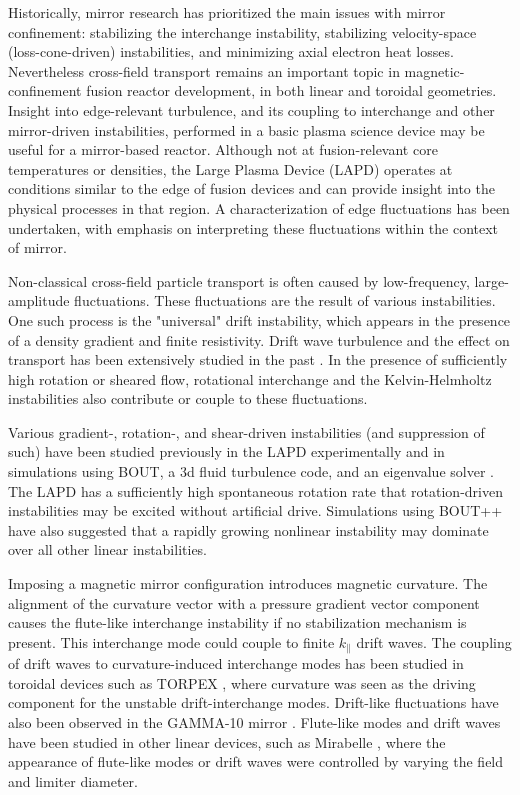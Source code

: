 Historically, mirror research has prioritized the main issues with mirror confinement: stabilizing the interchange instability, stabilizing velocity-space (loss-cone-driven) instabilities, and minimizing axial electron heat losses. Nevertheless cross-field transport remains an important topic in magnetic-confinement fusion reactor development, in both linear and toroidal geometries. Insight into edge-relevant turbulence, and its coupling to interchange and other mirror-driven instabilities, performed in a basic plasma science device may be useful for a mirror-based reactor. Although not at fusion-relevant core temperatures or densities, the Large Plasma Device (LAPD) operates at conditions similar to the edge of fusion devices and can provide insight into the physical processes in that region. 
A characterization of edge fluctuations has been undertaken, with emphasis on interpreting these fluctuations within the context of mirror. 

Non-classical cross-field particle transport is often caused by low-frequency, large-amplitude fluctuations. These fluctuations are the result of various instabilities. One such process is the "universal" drift instability, which appears in the presence of a density gradient and finite resistivity. Drift wave turbulence and the effect on transport has been extensively studied in the past \cite{Horton_1999, Tynan_review_2009}. In the presence of sufficiently high rotation or sheared flow, rotational interchange and the Kelvin-Helmholtz instabilities also contribute or couple to these fluctuations. 

Various gradient-, rotation-, and shear-driven instabilities (and suppression of such) have been studied previously in the LAPD experimentally \cite{Schaffner_2012, Schaffner_turbulence_2013, Schaffner_2013} and in simulations using BOUT, a 3d fluid turbulence code, and an eigenvalue solver \cite{Popovich_2010}. The LAPD has a sufficiently high spontaneous rotation rate that rotation-driven instabilities may be excited without artificial drive. Simulations using BOUT++ \cite{Friedman_2013} have also suggested that a rapidly growing nonlinear instability may dominate over all other linear instabilities.

Imposing a magnetic mirror configuration introduces magnetic curvature. The alignment of the curvature vector with a pressure gradient vector component causes the flute-like interchange instability if no stabilization mechanism is present. This interchange mode could couple to finite $k_\parallel$ drift waves. The coupling of drift waves to curvature-induced interchange modes has been studied in toroidal devices such as TORPEX \cite{Poli_experimental_2006, Fasoli_electrostatic_2006}, where curvature was seen as the driving component for the unstable drift-interchange modes. Drift-like fluctuations have also been observed in the GAMMA-10 mirror \cite{Mase_1991, Yoshikawa_2010}. Flute-like modes and drift waves have been studied in other linear devices, such as Mirabelle \cite{Brochard_transition_2005}, where the appearance of flute-like modes or drift waves were controlled by varying the field and limiter diameter. 

